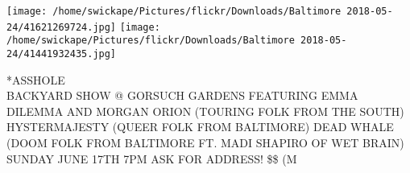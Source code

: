 \documentclass[10pt,letterpaper]{article}
\begin{document}
\texttt{[image: /home/swickape/Pictures/flickr/Downloads/Baltimore 2018-05-24/41621269724.jpg]}
\texttt{[image: /home/swickape/Pictures/flickr/Downloads/Baltimore 2018-05-24/41441932435.jpg]}

*ASSHOLE\\
BACKYARD SHOW @ GORSUCH GARDENS FEATURING EMMA DILEMMA AND MORGAN ORION (TOURING FOLK FROM THE SOUTH) HYSTERMAJESTY (QUEER FOLK FROM BALTIMORE) DEAD WHALE (DOOM FOLK FROM BALTIMORE FT. MADI SHAPIRO OF WET BRAIN) SUNDAY JUNE 17TH 7PM ASK FOR ADDRESS! \$\$ (M
\pagebreak
\end{document}
